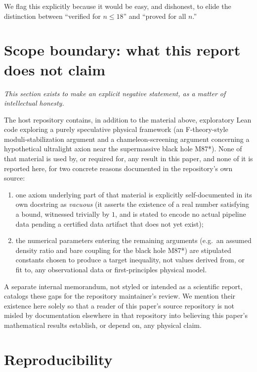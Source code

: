 \documentclass[11pt]{article}
\begin{document}
We flag this explicitly because it would be easy, and dishonest, to elide the
distinction between ``verified for $n\le 18$'' and ``proved for all $n$.''

\section{Scope boundary: what this report does not claim}
\label{sec:scope}

\emph{This section exists to make an explicit negative statement, as a matter
of intellectual honesty.}

The host repository contains, in addition to the material above, exploratory
Lean code exploring a purely speculative physical framework (an F-theory-style
moduli-stabilization argument and a chameleon-screening argument concerning a
hypothetical ultralight axion near the supermassive black hole M87*). None of
that material is used by, or required for, any result in this paper, and none
of it is reported here, for two concrete reasons documented in the
repository's own source:
\begin{enumerate}
  \item one axiom underlying part of that material is explicitly
    self-documented in its own docstring as \emph{vacuous} (it asserts the
    existence of a real number satisfying a bound, witnessed trivially by
    $1$, and is stated to encode no actual pipeline data pending a
    certified data artifact that does not yet exist);
  \item the numerical parameters entering the remaining arguments (e.g.\ an
    assumed density ratio and bare coupling for the black hole M87*) are
    stipulated constants chosen to produce a target inequality, not values
    derived from, or fit to, any observational data or first-principles
    physical model.
\end{enumerate}
A separate internal memorandum, not styled or intended as a scientific report,
catalogs these gaps for the repository maintainer's review. We mention their
existence here solely so that a reader of this paper's source repository is
not misled by documentation elsewhere in that repository into believing this
paper's mathematical results establish, or depend on, any physical claim.

\section{Reproducibility}
\label{sec:repro}
\end{document}
